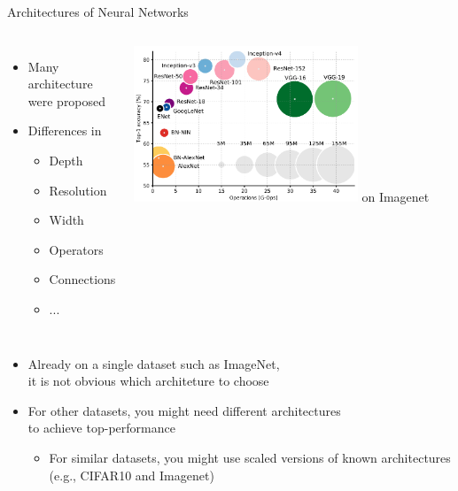 \begin{frame}[c]{Architectures of Neural Networks}

\begin{columns}
	
	\begin{itemize}
		\item Many architecture were proposed
		\item Differences in 
		\begin{itemize}
			\item Depth
			\item Resolution
			\item Width
			\item Operators
			\item Connections
			\item ...
		\end{itemize}
	\end{itemize}
	
	
	\centering
	\includegraphics[width=0.7\textwidth]{images/overview_achitecture_perf.PNG}\newline
	on Imagenet~
	
\end{columns}

\pause
\begin{itemize}
	\item Already on a single dataset such as ImageNet,\\ it is not obvious which architeture to choose
	\pause
	\item For other datasets, you might need different architectures\\ to achieve top-performance
	
	\pause
	\begin{itemize}
		\item For similar datasets, you might use scaled versions of known architectures\\ (e.g., CIFAR10 and Imagenet)
	\end{itemize}
\end{itemize}

\end{frame}
